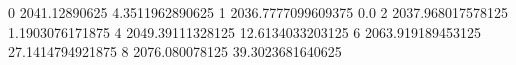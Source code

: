 0 2041.12890625 4.3511962890625
1 2036.7777099609375 0.0
2 2037.968017578125 1.1903076171875
4 2049.39111328125 12.6134033203125
6 2063.919189453125 27.1414794921875
8 2076.080078125 39.3023681640625
